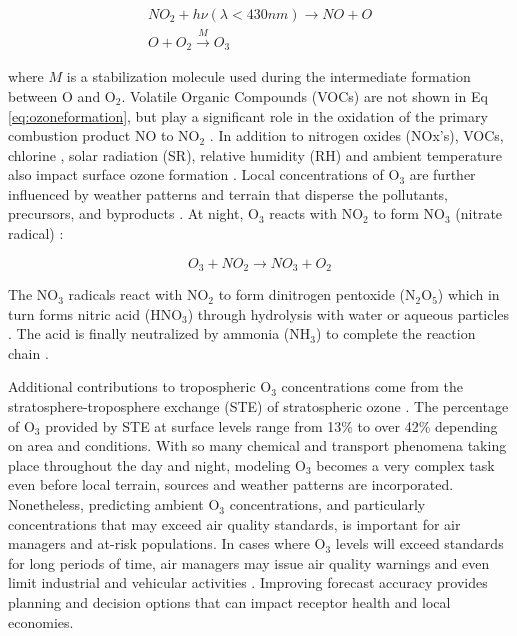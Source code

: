 \begin{equation}
\label{eq:ozoneformation}
\begin{gathered}
NO_{2}+h\nu (\lambda < 430nm) \rightarrow NO+O \\
O+O_{2}\overset{M}{\rightarrow} O_{3}
\end{gathered}
\end{equation}

\noindent
where $M$ is a stabilization molecule used during the intermediate formation between O and O$_{2}$. Volatile Organic Compounds (VOCs) are not shown in Eq \ref{eq:ozoneformation}, but play a significant role in the oxidation of the primary combustion product NO to NO$_{2}$ \citep{Song2011}. In addition to nitrogen oxides (NOx's), VOCs, chlorine \citep{Thornton2010}, solar radiation (SR), relative humidity (RH) and ambient temperature also impact surface ozone formation \citep{Sadanaga2003}.  Local concentrations of O$_{3}$ are further influenced by weather patterns and terrain that disperse the pollutants, precursors, and byproducts \citep{Beck1998}. At night, O$_{3}$ reacts with NO$_{2}$ to form NO$_{3}$ (nitrate radical) \citep{Finlayson1993}:

\begin{equation}
\label{eq:nitrateformation}
O_{3} + NO_{2}\rightarrow NO_{3}+O_{2} 
\end{equation}

The NO$_{3}$ radicals react with NO$_{2}$ to form dinitrogen pentoxide (N$_{2}$O$_{5}$) which in turn forms nitric acid (HNO$_{3}$) through hydrolysis with water or aqueous particles \citep{Song2011}. The acid is finally neutralized by ammonia (NH$_{3}$) to complete the reaction chain \citep{Brown2012}.

Additional contributions to tropospheric O$_{3}$ concentrations come from the stratosphere-troposphere exchange (STE) of stratospheric ozone \citep{Tarasick2008}. The percentage of O$_{3}$ provided by STE at surface levels range from 13\% \citep{Cooper2006} to over 42\% \citep{Lelieveld2000} depending on area and conditions. With so many chemical and transport phenomena taking place throughout the day and night, modeling O$_{3}$ becomes a very complex task even before local terrain, sources and weather patterns are incorporated. Nonetheless, predicting ambient O$_{3}$ concentrations, and particularly concentrations that may exceed air quality standards, is important for air managers and at-risk populations.  In cases where O$_{3}$ levels will exceed standards for long periods of time, air managers may issue air quality warnings and even limit industrial and vehicular activities \citep{Kuhlbusch2014, Welch2005}. Improving forecast accuracy provides planning and decision options that can impact receptor health and local economies.

